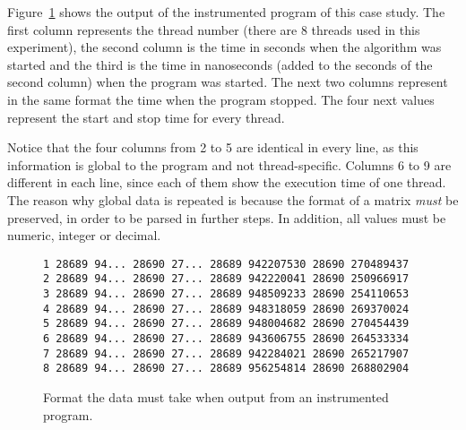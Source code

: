 Figure~\ref{fig:output} shows the output of the instrumented program of this case study. The first column represents the thread number (there are 8 threads used in this experiment), the second column is the time in seconds when the algorithm was started and the third is the time in nanoseconds (added to the seconds of the second column) when the program was started. The next two columns represent in the same format the time when the program stopped. The four next values represent the start and stop time for every thread. 

Notice that the four columns from 2 to 5 are identical in every line, as this information is global to the program and not thread-specific. Columns 6 to 9 are different in each line, since each of them show the execution time of one thread. The reason why global data is repeated is because the format of a matrix \emph{must} be preserved, in order to be parsed in further steps. In addition, all values must be numeric, integer or decimal.

\begin{figure}
\centering
\begin{lstlisting}
1 28689 94... 28690 27... 28689 942207530 28690 270489437
2 28689 94... 28690 27... 28689 942220041 28690 250966917
3 28689 94... 28690 27... 28689 948509233 28690 254110653
4 28689 94... 28690 27... 28689 948318059 28690 269370024
5 28689 94... 28690 27... 28689 948004682 28690 270454439
6 28689 94... 28690 27... 28689 943606755 28690 264533334
7 28689 94... 28690 27... 28689 942284021 28690 265217907
8 28689 94... 28690 27... 28689 956254814 28690 268802904
\end{lstlisting}
\caption{Format the data must take when output from an instrumented program.}
\label{fig:output}
\end{figure}

